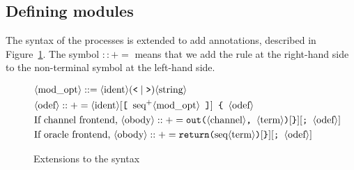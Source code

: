 \subsection{Defining modules}

The syntax of the processes is extended to add annotations, described in
Figure~\ref{fig:syntaxext}. The symbol $::+=$ means that we add the rule at
the right-hand side to the non-terminal symbol at the left-hand side.

\begin{figure}
\begin{align*}
&\langle\textrm{mod\_opt}\rangle ::= \langle\textrm{ident}\rangle
(\texttt{<}\mid\texttt{>})\langle\textrm{string}\rangle\\
&\langle\textrm{odef}\rangle ::+= \langle\textrm{ident}\rangle [\texttt{[ }\textrm{seq}^+\langle\textrm{mod\_opt}\rangle\texttt{ ]}]\texttt{ \{ }\langle\textrm{odef}\rangle{}\\
&\text{If channel frontend, }\langle\textrm{obody}\rangle ::+= \texttt{out(}\langle\textrm{channel}\rangle\texttt{,
}\langle\textrm{term}\rangle\texttt{)}[\texttt{\}}][\texttt{; }\langle\textrm{odef}\rangle]\\
&\text{If oracle frontend, }\langle\textrm{obody}\rangle ::+= \texttt{return(}\textrm{seq}\langle\textrm{term}\rangle\texttt{)}[\texttt{\}}][\texttt{; }\langle\textrm{odef}\rangle]
\end{align*}
\caption{Extensions to the syntax}
\label{fig:syntaxext}
\end{figure}

